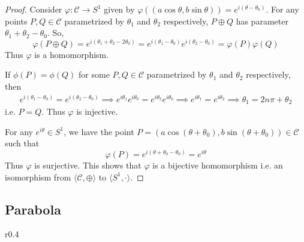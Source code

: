 \begin{proof}
    Consider $\varphi:\mathcal{C} \to S^1$ given by
    $\varphi((a\cos\theta,b\sin\theta)) = e^{i(\theta-\theta_0)}$. For any points
    $P,Q\in\mathcal{C}$ parametrized by $\theta_1$ and $\theta_2$ respectively,
    $P \oplus Q$ has parameter $\theta_1 + \theta_2 - \theta_0$. So,
    \[
        \varphi(P \oplus Q) = e^{i(\theta_1 + \theta_2 - 2\theta_0)}
        = e^{i(\theta_1 - \theta_0)}e^{i(\theta_2 - \theta_0)} = \varphi(P)\varphi(Q)
    \]
    Thus $\varphi$ is a homomorphism.
    \vspace{1ex}

    \noindent
    If $\phi(P)=\phi(Q)$ for some $P,Q\in\mathcal{C}$ parametrized by $\theta_1$
    and $\theta_2$ respectively, then
    \begin{align*}
        e^{i(\theta_1-\theta_0)} = e^{i(\theta_2-\theta_0)}
        \implies e^{i\theta_1}e^{i\theta_0} = e^{i\theta_2}e^{i\theta_0}
        \implies e^{i\theta_1} = e^{i\theta_2}
        \implies \theta_1 = 2n\pi + \theta_2
    \end{align*}
    i.e. $P=Q$. Thus $\varphi$ is injective.
    \vspace{1ex}

    \noindent
    For any $e^{i\theta} \in S^1$, we have the point
    $P=(a\cos(\theta+\theta_0),b\sin(\theta+\theta_0)) \in \mathcal{C}$ such that
    \[ \varphi(P) = e^{i(\theta + \theta_0 - \theta_0)} = e^{i\theta} \]
    Thus $\varphi$ is surjective. This shows that $\varphi$ is a bijective
    homomorphism i.e. an isomorphism from $\langle \mathcal{C},\oplus \rangle$ to
    $\langle S^1,\cdot \rangle$.
\end{proof}

\subsection*{Parabola}

\begin{wrapfigure}{r}{0.4\textwidth}
    \centering

    \caption{}
\end{wrapfigure}

